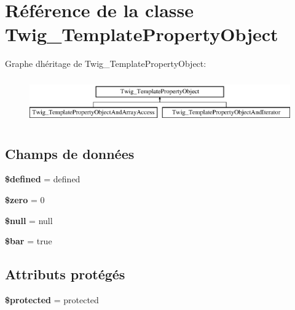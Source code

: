 \hypertarget{class_twig___template_property_object}{}\section{Référence de la classe Twig\+\_\+\+Template\+Property\+Object}
\label{class_twig___template_property_object}
Graphe d\textquotesingle{}héritage de Twig\+\_\+\+Template\+Property\+Object\+:\begin{figure}[H]
\begin{center}
\leavevmode
\includegraphics[height=1.951219cm]{class_twig___template_property_object}
\end{center}
\end{figure}
\subsection*{Champs de données}
\begin{DoxyCompactItemize}
\item 
{\bfseries \$defined} = \textquotesingle{}defined\textquotesingle{}\hypertarget{class_twig___template_property_object_a7037630c65a50821a29f3045e390465e}{}\label{class_twig___template_property_object_a7037630c65a50821a29f3045e390465e}

\item 
{\bfseries \$zero} = 0\hypertarget{class_twig___template_property_object_a3df958928cd7d9367ad3562920c50715}{}\label{class_twig___template_property_object_a3df958928cd7d9367ad3562920c50715}

\item 
{\bfseries \$null} = null\hypertarget{class_twig___template_property_object_a6009621538a15d305233377e69d9ddd8}{}\label{class_twig___template_property_object_a6009621538a15d305233377e69d9ddd8}

\item 
{\bfseries \$bar} = true\hypertarget{class_twig___template_property_object_ab669d165b99e23bf90d68a0a057f69ac}{}\label{class_twig___template_property_object_ab669d165b99e23bf90d68a0a057f69ac}

\end{DoxyCompactItemize}
\subsection*{Attributs protégés}
\begin{DoxyCompactItemize}
\item 
{\bfseries \$protected} = \textquotesingle{}protected\textquotesingle{}\hypertarget{class_twig___template_property_object_a2b7c879294b290c4a388522ce49a08d6}{}\label{class_twig___template_property_object_a2b7c879294b290c4a388522ce49a08d6}

\end{DoxyCompactItemize}


